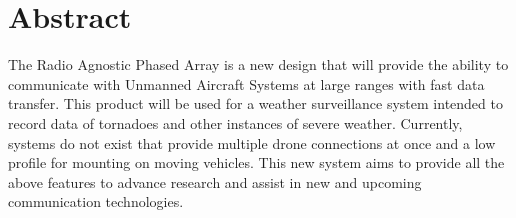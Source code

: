 \documentclass[UROP.tex]{subfiles}
\begin{document}
\bigskip
\section*{\Large Abstract}
	The Radio Agnostic Phased Array is a new design that will provide the ability to communicate with Unmanned Aircraft Systems at large ranges with fast data transfer.  This product will be used for a weather surveillance system intended to record data of tornadoes and other instances of severe weather.  Currently, systems do not exist that provide multiple drone connections at once and a low profile for mounting on moving vehicles.  This new system aims to provide all the above features to advance research and assist in new and upcoming communication technologies.
\end{document}
